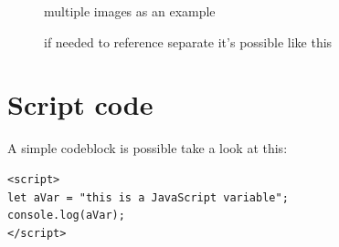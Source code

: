 \documentclass[10pt]{article}
\begin{document}
\begin{figure}[H]
	\centering
	\caption{multiple images as an example}
	\caption{if needed to reference separate it's possible like this}
\end{figure}

\section{Script code}
A simple codeblock is possible take a look at this:
\begin{lstlisting}
<script>
let aVar = "this is a JavaScript variable";
console.log(aVar);
</script>
\end{lstlisting}
\end{document}
